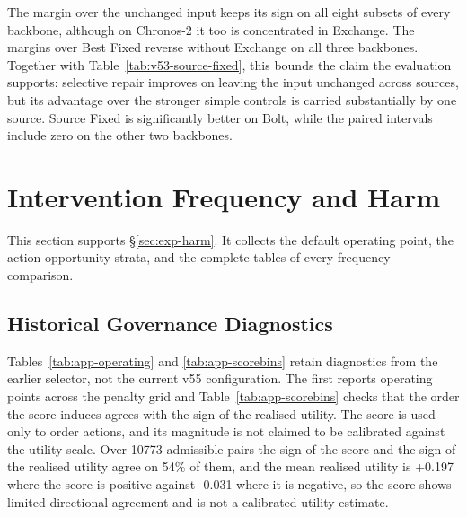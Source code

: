 \documentclass{article}
\begin{document}
The margin over the unchanged input keeps its sign on all eight subsets of every backbone,
although on Chronos-2 it too is concentrated in Exchange. The margins over Best Fixed
reverse without Exchange on all three backbones. Together with
Table~\ref{tab:v53-source-fixed}, this bounds the claim the evaluation supports: selective
repair improves on leaving the input unchanged across sources, but its advantage over the
stronger simple controls is carried substantially by one source. Source Fixed is significantly
better on Bolt, while the paired intervals include zero on the other two backbones.

\section{Intervention Frequency and Harm}

This section supports \S\ref{sec:exp-harm}. It collects the default operating point, the
action-opportunity strata, and the complete tables of every frequency comparison.

\subsection{Historical Governance Diagnostics}
\label{app:governance-fig}
Tables~\ref{tab:app-operating} and \ref{tab:app-scorebins} retain diagnostics from the earlier selector, not the current v55 configuration. The first reports operating points across the penalty grid and
Table~\ref{tab:app-scorebins} checks that the order the score induces agrees with the sign of
the realised utility. The score is used only to order actions, and its magnitude is not claimed
to be calibrated against the utility scale. Over 10773 admissible pairs the sign of the score and the sign of the realised utility agree on 54\% of them, and the mean realised utility is +0.197 where the score is positive against -0.031 where it is negative, so the score shows limited directional agreement and is not a calibrated utility estimate.
\end{document}
